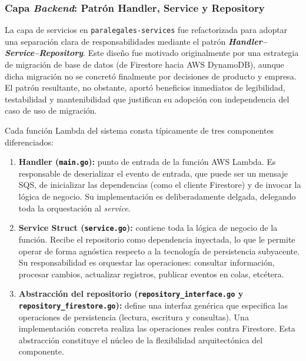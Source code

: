 \subsubsection{Capa \textit{Backend}: Patrón Handler, Service y Repository}

La capa de servicios en \texttt{paralegales-services} fue refactorizada para adoptar una separación clara de responsabilidades mediante el patrón \textbf{\textit{Handler--Service--Repository}}. Este diseño fue motivado originalmente por una estrategia de migración de base de datos (de Firestore hacia AWS DynamoDB), aunque dicha migración no se concretó finalmente por decisiones de producto y empresa. El patrón resultante, no obstante, aportó beneficios inmediatos de legibilidad, testabilidad y mantenibilidad que justifican su adopción con independencia del caso de uso de migración.

Cada función Lambda del sistema consta típicamente de tres componentes diferenciados:

\begin{enumerate}
  \item \textbf{Handler (\texttt{main.go}):} punto de entrada de la función AWS Lambda. Es responsable de deserializar el evento de entrada, que puede ser un mensaje SQS, de inicializar las dependencias (como el cliente Firestore) y de invocar la lógica de negocio. Su implementación es deliberadamente delgada, delegando toda la orquestación al \textit{service}.

  \item \textbf{Service Struct (\texttt{service.go}):} contiene toda la lógica de negocio de la función. Recibe el repositorio como dependencia inyectada, lo que le permite operar de forma agnóstica respecto a la tecnología de persistencia subyacente. Su responsabilidad es orquestar las operaciones: consultar información, procesar cambios, actualizar registros, publicar eventos en colas, etcétera.

  \item \textbf{Abstracción del repositorio (\texttt{repository\_interface.go} y \texttt{repository\_firestore.go}):} define una interfaz genérica que especifica las operaciones de persistencia (lectura, escritura y consultas). Una implementación concreta realiza las operaciones reales contra Firestore. Esta abstracción constituye el núcleo de la flexibilidad arquitectónica del componente.
\end{enumerate}

